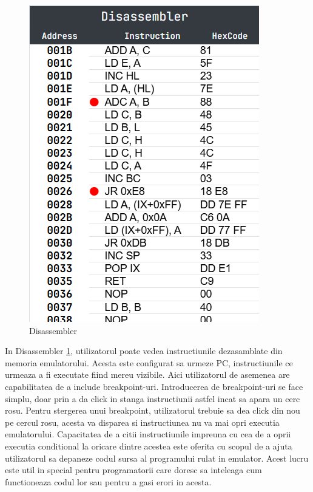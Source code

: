 \documentclass[titlepage,12pt]{article}
\begin{document}
\begin{figure}
    \centering
    \includegraphics[width=\linewidth]{images/disassembler.png}
    \caption{Disassembler}
    \label{fig:disassembler}
\end{figure}

In Disassembler \cref {fig:disassembler}, utilizatorul poate vedea instructiunile dezasamblate din memoria emulatorului. Acesta este configurat sa urmeze PC, instructiunile ce urmeaza a fi executate fiind mereu vizibile. Aici utilizatorul de asemenea are capabilitatea de a include breakpoint-uri. Introducerea de breakpoint-uri se face simplu, doar prin a da click in stanga instructiunii astfel incat sa apara un cerc rosu. Pentru stergerea unui breakpoint, utilizatorul trebuie sa dea click din nou pe cercul rosu, acesta va disparea si instructiunea nu va mai opri executia emulatorului. Capacitatea de a citii instructiunile impreuna cu cea de a oprii executia conditional la oricare dintre acestea este oferita cu scopul de a ajuta utilizatorul sa depaneze codul sursa al programului rulat in emulator. Acest lucru este util in special pentru programatorii care doresc sa inteleaga cum functioneaza codul lor sau pentru a gasi erori in acesta.
\end{document}

